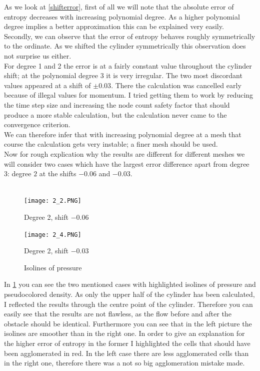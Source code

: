 	As we look at \cref{shifterror}, first of all we will note that the absolute error of entropy decreases with increasing polynomial degree. As a higher polynomial degree implies a better approximation this can be explained very easily. \\ \indent
	Secondly, we can observe that the error of entropy behaves roughly symmetrically to the ordinate. As we shifted the cylinder symmetrically this observation does not surprise us either. \\ \indent
	For degree 1 and 2 the error is at a fairly constant value throughout the cylinder shift; at the polynomial degree 3 it is very irregular. The two most discordant values appeared at a shift of $\pm 0.03$. There the calculation was cancelled early because of illegal values for momentum. I tried getting them to work by reducing the time step size and increasing the node count safety factor that should produce a more stable calculation, but the calculation never came to the convergence criterion. \\ \indent
	We can therefore infer that with increasing polynomial degree at a mesh that course the calculation gets very instable; a finer mesh should be used. \\ \indent
	Now for rough explication why the results are different for different meshes we will consider two cases which have the largest error difference apart from degree 3: degree $2$ at the shifts $-0.06$ and $-0.03$. \\\\
	
	\begin{figure}[htp]
		\centering
		\begin{minipage}[b]{0.5\textwidth}
			\centering
			\texttt{[image: 2\_2.PNG]}
			\caption*{Degree 2, shift $-0.06$}
			\label{fig:2_2}
		\end{minipage}%
		\begin{minipage}[b]{0.5\textwidth}
			\centering
			\texttt{[image: 2\_4.PNG]}
			\caption*{Degree 2, shift $-0.03$}
			\label{fig:2_4}
		\end{minipage}
		\caption{Isolines of pressure}\label{fig:isoshift}
	\end{figure}
	
	In \cref{fig:isoshift} you can see the two mentioned cases with highlighted isolines of pressure and pseudocolored density. As only the upper half of the cylinder has been calculated, I reflected the results through the centre point of the cylinder. Therefore you can easily see that the results are not flawless, as the flow before and after the obstacle should be identical. Furthermore you can see that in the left picture the isolines are smoother than in the right one. In order to give an explanation for the higher error of entropy in the former I highlighted the cells that should have been agglomerated in red. In the left case there are less agglomerated cells than in the right one, therefore there was a not so big agglomeration mistake made.\\\\ 
	

